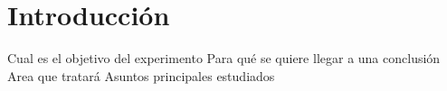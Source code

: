 \section{Introducción}

Cual es el objetivo del experimento
Para qué se quiere llegar a una conclusión
Area que tratará
Asuntos principales estudiados
